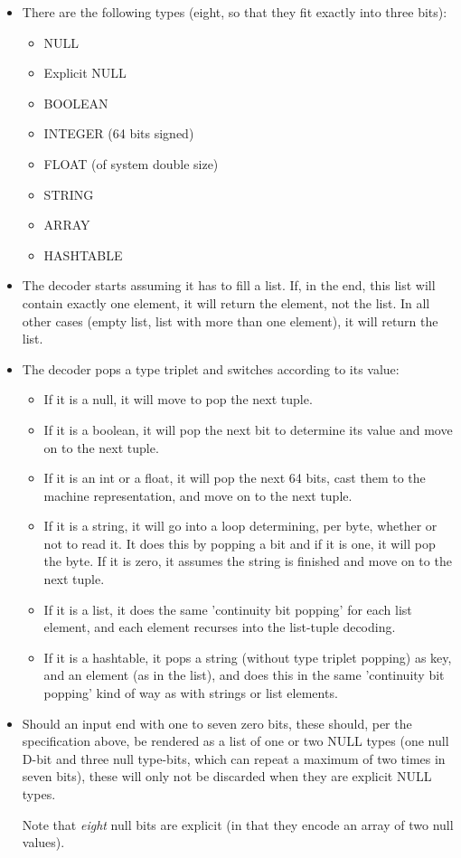 \begin{itemize}
\item There are the following types (eight, so that they fit exactly
      into three bits):
  \begin{itemize}
  \item NULL
  \item Explicit NULL
  \item BOOLEAN
  \item INTEGER (64 bits signed)
  \item FLOAT (of system double size)
  \item STRING
  \item ARRAY
  \item HASHTABLE
  \end{itemize}

\item The decoder starts assuming it has to fill a list.
  If, in the end, this list will contain exactly one element, it will
  return the element, not the list. In all other cases (empty list,
  list with more than one element), it will return the list.

\item The decoder pops a type triplet and switches according to its value:
  \begin{itemize}
  \item If it is a null, it will move to pop the next tuple.
  \item If it is a boolean, it will pop the next bit to determine its value
        and move on to the next tuple.
  \item If it is an int or a float, it will pop the next 64 bits,
        cast them to the machine representation, and move on to the next tuple.
  \item If it is a string, it will go into a loop determining, per byte,
        whether or not to read it. It does this by popping a bit and if
        it is one, it will pop the byte. If it is zero, it assumes the
        string is finished and move on to the next tuple.
  \item If it is a list, it does the same 'continuity bit popping' for
        each list element, and each element recurses into the list-tuple
        decoding.
  \item If it is a hashtable, it pops a string (without type triplet popping)
        as key, and an element (as in the list), and does this in the same
        'continuity bit popping' kind of way as with strings or list elements.
  \end{itemize}

\item Should an input end with one to seven zero bits, these should, per the
  specification above, be rendered as a list of one or two NULL types
  (one null D-bit and three null type-bits, which can repeat a maximum of
  two times in seven bits), these will only not be discarded when they
  are explicit NULL types.

  Note that \textit{eight} null bits are explicit (in that they encode
  an array of two null values).
\end{itemize}

